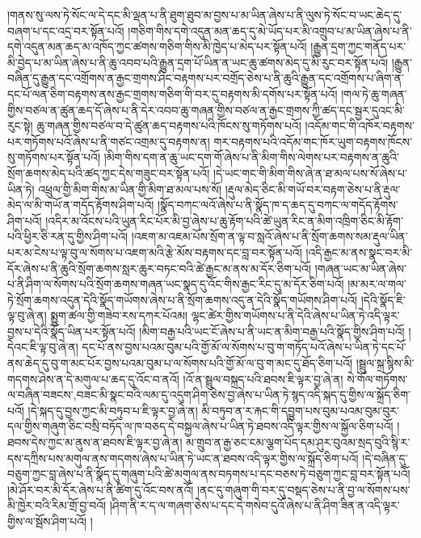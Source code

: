 །གནས་སུ་ལས་ཏེ་སོང་ལ་དེ་དང་མི་ལྡན་པ་ནི་ཐུག་ཐུབ་མ་བྱས་པ་མ་ཡིན་ཞེས་པ་ནི་ལུས་ཏེ་སོང་བ་ཡང་ཆེད་དུ་བཞག་པ་དང་འདྲ་བར་སྟོན་པའོ། །གཅིག་གིས་དགེ་འདུན་མན་ཆད་དུ་མེ་ཡོད་པར་མི་འགྲུབ་པ་མ་ཡིན་ཞེས་པ་ནི་དགེ་འདུན་མན་ཆད་མ་འཁོད་ཀྱང་ཚགས་གཅིག་གིས་མི་ཁྱེད་པ་མེད་པར་སྟོན་པའོ། །རྒྱུན་དྲག་ཀྱང་གནོད་པར་མི་བྱེད་པ་མ་ཡིན་ཞེས་པ་ནི་ཆུ་འབབ་པའི་རྒྱུན་དྲག་པོ་ཡིན་ན་ཡང་ཆུ་ཚགས་མེད་དུ་མི་རུང་བར་སྟོན་པའོ། །རྒྱུན་བཞིན་དུ་རྒྱུན་དང་འགྲོགས་ན་རྒྱང་གྲགས་ཤིང་བརྟགས་པར་བགྲོད་ཅེས་པ་ནི་ཆུའི་རྒྱུན་དང་འགྲོགས་པ་ཞིག་ན་དང་པོ་ལན་ཅིག་བརྟགས་ནས་རྒྱང་གྲགས་གཅིག་གི་བར་དུ་བརྟགས་མི་དགོས་པར་སྟོན་པའོ། །གལ་ཏེ་ཆུ་གཞན་གྱིས་བཙལ་ན་ཚུན་ཆད་དོ་ཞེས་པ་ནི་དེར་འབབ་ཆུ་གཞན་གྱིས་བཙལ་ན་རྒྱང་གྲགས་ཀྱི་ཚད་དང་སྦྱར་དུའང་མི་རུང་སྟེ། ཆུ་གཞན་གྱིས་བཙལ་བ་དེ་ཚུན་ཆད་བརྟགས་པའི་ཁོངས་སུ་གཏོགས་པའོ། །འདོམ་གང་གི་འཁོར་བརྟགས་པར་གཏོགས་པའོ་ཞེས་པ་ནི་གཙང་འགྲམ་དུ་བརྟགས་ན། གར་བརྟགས་པའི་འདོམ་གང་ཁོར་ཡུག་བརྟགས་ཁོངས་སུ་གཏོགས་པར་སྟོན་པའོ། །མིག་གིས་དག་ན་ཆུ་ཡང་དག་གོ་ཞེས་པ་ནི་མིག་གིས་ལེགས་པར་བརྟགས་ན་ཆུའི་སྲོག་ཆགས་མེད་པའི་ཚད་ཀྱང་དེས་གཟུང་བར་སྟོན་པའོ། །དེ་ཡང་གང་གི་མིག་གིས་ཞེ་ན་ཐ་མལ་པས་སོ་ཞེས་པ་ཡིན་ཏེ། འཕྲུལ་གྱི་མིག་གིས་མ་ཡིན་གྱི་མིག་ཐ་མལ་པས་སོ། །རྡུལ་མེད་ཅིང་མི་གཡོ་བར་བརྟག་ཅེས་པ་ནི་རྡུལ་མེད་ལ་མི་གཡོ་ན་གདོད་རྟོགས་ཤིག་པའོ། །སྣོད་བཀང་ལའོ་ཞེས་པ་ནི་སྣོད་ཁ་ད་ཆད་དུ་བཀང་ལ་གདོད་རྟོགས་ཤིག་པའོ། །འདིར་མ་འོངས་པའི་ཡུན་རིང་པོར་མི་བྱ་ཞེས་པ་ཆུ་རྟོག་པའི་ཚེ་ཡུན་རིང་ན་མིག་འཁྲིག་ཅིང་མི་རྟོག་པའི་ཕྱིར་ཅི་རན་དུ་གྱིས་ཤིག་པའོ། །འཇག་མ་འཇམ་པོས་སྲོག་ན་ལྟ་བ་སླའོ་ཞེས་པ་ནི་སྲོག་ཆགས་སམ་རྡུལ་ཡིན་པར་མ་ངེས་པ་ལྟ་བུ་ལ་སོགས་པ་འཇག་མའི་རྩེ་མོས་བརྟགས་དང་བླ་བར་སྟོན་པའོ། །འདི་རྒྱང་མ་ནས་སྣང་བར་མི་དོར་ཞེས་པ་ནི་ཆུའི་སྲོག་ཆགས་སླར་ཆུར་བཏང་བའི་ཚེ་རྒྱང་མ་ནས་མ་དོར་ཅིག་པའོ། །གཞན་ཡང་མ་ཡིན་ཞེས་པ་ནི་ཤིག་ལ་སོགས་པའི་སྲོག་ཆགས་གཞན་ཡང་སྣད་དུ་འོང་གིས་རྒྱང་རིང་དུ་མ་དོར་ཅིག་པའོ། །མ་མར་ལ་གལ་ཏེ་སྲོག་ཆགས་འདུན་དེའི་སྣོད་གཡོགས་ཞེས་པ་ནི་སྲོག་ཆགས་འདུ་ན་དེའི་སྣོད་གཡོགས་ཤིག་པའོ། །དེའི་སྣོད་ཇི་ལྟ་བུ་ཞེ་ན། སྨྱུག་ཚལ་གྱི་གཟེབ་རས་དཀར་པོའམ། ལྷང་ཚེར་གྱིས་གཡོགས་པ་ནི་དེའི་ཞེས་པ་ཡིན་ཏེ་འདི་ལྟར་བྱས་པ་དེའི་སྣོད་ཡིན་པར་སྟོན་པའོ། །མིག་བརྒྱ་པའི་ཡང་ངོ་ཞེས་པ་ནི་ཡང་ན་མིག་བརྒྱ་པའི་སྣོད་གྱིས་ཤིག་པའོ། །དེའང་ཇི་ལྟ་བུ་ཞེ་ན། དང་པོ་ནས་བྱས་པའམ་བུམ་པའི་གྱོ་མོ་ལ་སོགས་པ་བུ་ག་གཏོད་པའོ་ཞེས་པ་ཡིན་ཏེ་དང་པོ་ནས་ཆེད་དུ་བུ་ག་མང་པོར་བྱས་པའམ་བུམ་པ་ལ་སོགས་པའི་གྱོ་མོ་ལ་བུ་ག་མང་དུ་ཐོད་ཅིག་པའོ། །སྦྲུལ་སྐྲ་སྙིས་མི་གདགས་ཤེས་ན་དེ་མགུལ་པ་ཆད་དུ་འོང་བ་ནའོ། །འོ་ན་སྦྲུལ་བསྐྲད་པའི་ཐབས་ཇི་ལྟར་བྱ་ཞེ་ན། སེ་གོལ་གཏོགས་ལ་བཞིན་{བཟངས་,བཟང་}མི་སྣང་བའི་ལམ་དུ་འདུག་ཤིག་ཅེས་བྱ་ཞེས་པ་ཡིན་ཏེ་སྙད་འདི་སྐད་དུ་གྱིས་ལ་སྐྲོད་ཅིག་པའོ། །དེ་སྐད་དུ་བྱས་ཀྱང་མི་བཏུབ་པ་ཇི་ལྟར་བྱ་ཞེ་ན། མི་བཏུབ་ན་ར་རྐང་གི་དབྱུག་པས་བུམ་པའམ་བུམ་བུར་དལ་གྱིས་གཞུག་ཅིང་བསྲི་བཏོད་ལ་ཁ་བཅད་དེ་བསྐྱལ་ཞེས་པ་ཡིན་ཏེ་ཐབས་འདི་ལྟར་གྱིས་ལ་སྐྱོལ་ཅིག་པའོ། །ཐབས་དེས་ཀྱང་མ་ནུས་ན་ཐབས་ཇི་ལྟར་བྱ་ཞེ་ན། མ་གྲུབ་ན་རྒྱ་ཅང་ངམ་ལྕག་པོད་དམ་ཤུར་བུའམ་སྲད་བུའི་སྙི་ར་དས་དཀྲིས་པས་མགུལ་ནས་གདགས་ཞེས་པ་ཡིན་ཏེ་ཡང་ན་ཐབས་འདི་ལྟར་གྱིས་ལ་སྐྲོད་ཅིག་པའོ། །དེ་བཞིན་དུ་བཅུག་ཀྱང་བླ་ཞེས་པ་ནི་སྣོད་དུ་གཞུག་པའི་ཚེ་མགུལ་ནས་བཏགས་པ་དང་བཅས་ཏེ་བཅུག་ཀྱང་བླ་བར་སྟོན་པའོ། །མེ་ཤོར་བར་མི་དོར་ཞེས་པ་ནི་ཚིག་དུ་འོང་བས་ནའོ། །ནང་དུ་གཞུག་གི་བར་དུ་བསྡད་ཅེས་པ་ནི་བྱ་ལ་སོགས་པས་མི་ཁྱེར་བའི་རིམ་གྲོ་བྱ་བའོ། །ཤིག་ནི་ར་ད་ལ་གཞག་ཅེས་པ་དང་དེ་གསེབ་དུའོ་ཞེས་པ་ནི་ཤིག་ཟིན་ན་འདི་ལྟར་གྱིས་ལ་སྦོས་ཤིག་པའོ། །

